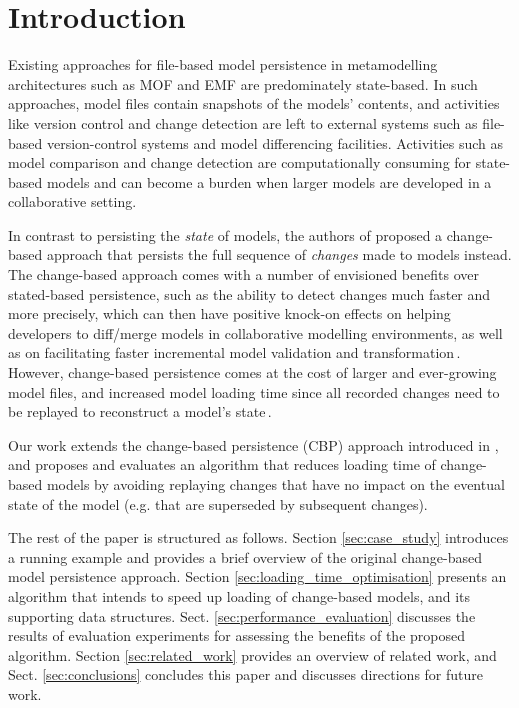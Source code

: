 \documentclass{llncs}
\begin{document}
\section{Introduction}
\label{sec:introduction}
Existing approaches for file-based model persistence in metamodelling architectures such as MOF and EMF are predominately state-based.
In such approaches, model files contain snapshots of the models' contents, and activities like version control and change detection are left to external systems such as file-based version-control systems and model differencing facilities.
Activities such as model comparison and change detection are computationally consuming for state-based models and can become a burden when larger models are developed in a collaborative setting. 

In contrast to persisting the \emph{state} of models, the authors of \cite{yohannis2017turning} proposed a change-based approach that persists the full sequence of \emph{changes} made to models instead.
The change-based approach comes with a number of envisioned benefits over stated-based persistence, such as the ability to detect changes much faster and more precisely, which can then have positive knock-on effects on helping developers to diff/merge models in collaborative modelling environments, as well as on facilitating faster incremental model validation and transformation\,\cite{rath2012derived,ogunyomi2015property}.
However, change-based persistence comes at the cost of larger and ever-growing model files, and increased model loading time since all recorded changes need to be replayed to reconstruct a model's state\,\cite{yohannis2017turning}.   

Our work extends the change-based persistence (CBP) approach introduced in \cite{yohannis2017turning}, and proposes and evaluates an algorithm that reduces loading time of change-based models by avoiding replaying changes that have no impact on the eventual state of the model (e.g. that are superseded by subsequent changes).

The rest of the paper is structured as follows. Section \ref{sec:case_study} introduces a running example and provides a brief overview of the original change-based model persistence approach.
Section \ref{sec:loading_time_optimisation} presents an algorithm that intends to speed up loading of change-based models, and its supporting data structures. %
Sect. \ref{sec:performance_evaluation} discusses the results of evaluation experiments for assessing the benefits of the proposed algorithm. Section \ref{sec:related_work} provides an overview of related work, and Sect. \ref{sec:conclusions} concludes this paper and discusses directions for future work.
\end{document}
